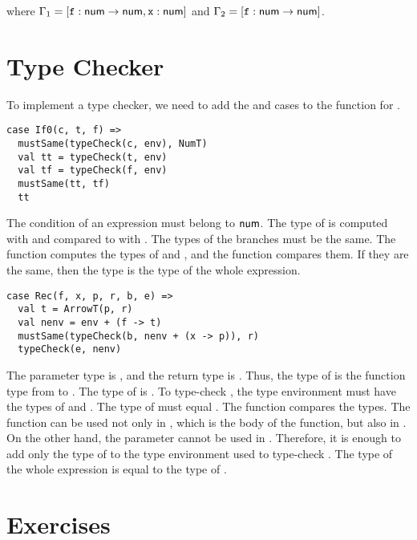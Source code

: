 where
$\Gamma_1=[\texttt{f}:\textsf{num}\rightarrow\textsf{num},\texttt{x}:\textsf{num}]$
and
$\Gamma_2=[\texttt{f}:\textsf{num}\rightarrow\textsf{num}]$.

\section{Type Checker}

To implement a type checker, we need to add the  and  cases
to the  function for \plang.

\begin{verbatim}
case If0(c, t, f) =>
  mustSame(typeCheck(c, env), NumT)
  val tt = typeCheck(t, env)
  val tf = typeCheck(f, env)
  mustSame(tt, tf)
  tt
\end{verbatim}

The condition of an expression must belong to $\textsf{num}$. The type of  is
computed with  and compared to  with .
The types of the branches must be the same. The  function
computes the types of  and , and the  function
compares them. If they are the same, then the type is the type of the whole expression.

\begin{verbatim}
case Rec(f, x, p, r, b, e) =>
  val t = ArrowT(p, r)
  val nenv = env + (f -> t)
  mustSame(typeCheck(b, nenv + (x -> p)), r)
  typeCheck(e, nenv)
\end{verbatim}

The parameter type is , and the return type is . Thus, the type
of  is the function type from  to . The type of 
is . To type-check , the type environment must have the types of
 and . The type of  must equal . The
 function compares the types. The function can be used not only in
, which is the body of the function, but also in . On the other
hand, the parameter  cannot be used in . Therefore, it is enough
to add only the type of  to the type environment used to type-check
. The type of the whole expression is equal to the type of .

\section{Exercises}

